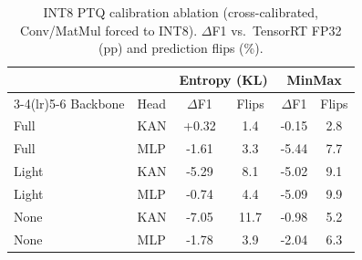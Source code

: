 \begin{table}[t]
\centering
\caption{INT8 PTQ calibration ablation (cross-calibrated, Conv/MatMul forced to INT8). $\Delta$F1 vs.\ TensorRT FP32 (pp) and prediction flips (\%).}
\label{tab:calib}
\setlength{\tabcolsep}{4pt}
\small
\begin{tabular}{llcccc}
\toprule
 & & \multicolumn{2}{c}{Entropy (KL)} & \multicolumn{2}{c}{MinMax} \\
\cmidrule(lr){3-4}\cmidrule(lr){5-6}
Backbone & Head & $\Delta$F1 & Flips & $\Delta$F1 & Flips \\
\midrule
Full & KAN & +0.32 & 1.4 & -0.15 & 2.8 \\
Full & MLP & -1.61 & 3.3 & -5.44 & 7.7 \\
Light & KAN & -5.29 & 8.1 & -5.02 & 9.1 \\
Light & MLP & -0.74 & 4.4 & -5.09 & 9.9 \\
None & KAN & -7.05 & 11.7 & -0.98 & 5.2 \\
None & MLP & -1.78 & 3.9 & -2.04 & 6.3 \\
\bottomrule
\end{tabular}
\end{table}